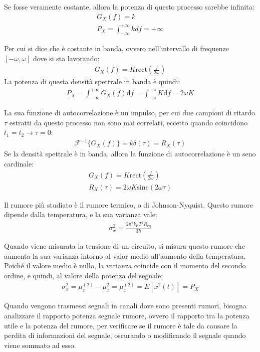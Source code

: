 \documentclass{article}
\newcommand{\rect}{\mathrm{rect}}
\newcommand{\sinc}{\mathrm{sinc}}
\newcommand{\df}{\mathrm{d}}
\numberwithin{equation}{subsection}
\begin{document}
Se fosse veramente costante, allora la potenza di questo processo sarebbe infinita:
\begin{gather*}
    G_X(f)=k\\
    P_X=\displaystyle\int_{-\infty}^{+\infty}kdf=+\infty
\end{gather*}

Per cui si dice che è costante in banda, ovvero nell'intervallo di frequenze $[-\omega,\omega]$ dove si sta lavorando:
\begin{gather*}
    G_X(f)=\displaystyle K\rect\left(\frac{f}{2\omega}\right)
\end{gather*}
La potenza di questa densità spettrale in banda è quindi:
\begin{gather*}
    P_X=\displaystyle\int_{-\infty}^{+\infty}G_X(f)\df f=\int_{-\omega}^{+\omega}K\df f=2\omega K
\end{gather*}


La sua funzione di autocorrelazione è un impulso, per cui due campioni di ritardo $\tau$ estratti da questo processo non sono mai correlati, eccetto quando coincidono
$t_1=t_2\to \tau=0$:
\begin{gather*}
    \mathscr{F}^{-1}\{G_X(f)\}=k\delta(\tau)=R_X(\tau)
\end{gather*}
Se la densità spettrale è in banda, allora la funzione di autocorrelazione è un seno cardinale:
\begin{gather*}
    G_X(f)=\displaystyle K\rect\left(\frac{f}{2\omega}\right)\\
    R_X(\tau)=2\omega K\sinc(2\omega\tau)
\end{gather*}

Il rumore più studiato è il rumore termico, o di Johnson-Nyquist. Questo rumore dipende dalla temperatura, e la sua varianza vale:
\begin{gather*}
    \sigma_x^2=\displaystyle\frac{2\pi^2k_\mathrm{B}T^2R_\mathrm{eq}}{3\hbar}
\end{gather*}

Quando viene misurata la tensione di un circuito, si misura questo rumore che aumenta la sua varianza intorno al valor medio all'aumento della temperatura. 
Poiché il valore medio è nullo, la varianza coincide con il momento del secondo ordine, e quindi, al valore della potenza del segnale:
\begin{gather*}
    \sigma_x^2=\mu_x^{(2)}-\mu_x^2=\mu_x^{(2)}=E[x^2(t)]=P_X
\end{gather*}

Quando vengono trasmessi segnali in canali dove sono presenti rumori, bisogna analizzare il rapporto potenza segnale rumore, ovvero il rapporto tra la potenza utile e la 
potenza del rumore, per verificare se il rumore è tale da causare la perdita di informazioni del segnale, oscurando o modificando il segnale quando viene sommato ad esso. 
\end{document}
